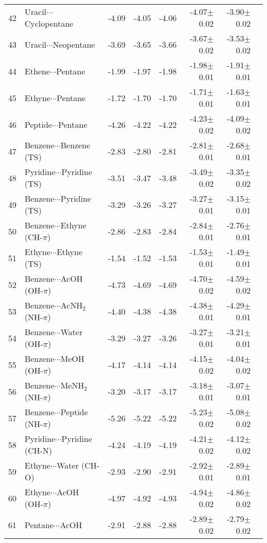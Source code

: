 \begin{longtable}{llrrrrrr}
42 & Uracil$\cdots$Cyclopentane & -4.09 & -4.05 & -4.06 & -4.07$\pm$0.02 & -3.90$\pm$0.02 \\
43 & Uracil$\cdots$Neopentane & -3.69 & -3.65 & -3.66 & -3.67$\pm$0.02 & -3.53$\pm$0.02 \\
44 & Ethene$\cdots$Pentane & -1.99 & -1.97 & -1.98 & -1.98$\pm$0.01 & -1.91$\pm$0.01 \\
45 & Ethyne$\cdots$Pentane & -1.72 & -1.70 & -1.70 & -1.71$\pm$0.01 & -1.63$\pm$0.01 \\
46 & Peptide$\cdots$Pentane & -4.26 & -4.22 & -4.22 & -4.23$\pm$0.02 & -4.09$\pm$0.02 \\
47 & Benzene$\cdots$Benzene (TS) & -2.83 & -2.80 & -2.81 & -2.81$\pm$0.01 & -2.68$\pm$0.01 \\
48 & Pyridine$\cdots$Pyridine (TS) & -3.51 & -3.47 & -3.48 & -3.49$\pm$0.02 & -3.35$\pm$0.02 \\
49 & Benzene$\cdots$Pyridine (TS) & -3.29 & -3.26 & -3.27 & -3.27$\pm$0.01 & -3.15$\pm$0.01 \\
50 & Benzene$\cdots$Ethyne (CH-$\pi$) & -2.86 & -2.83 & -2.84 & -2.84$\pm$0.01 & -2.76$\pm$0.01 \\
51 & Ethyne$\cdots$Ethyne (TS) & -1.54 & -1.52 & -1.53 & -1.53$\pm$0.01 & -1.49$\pm$0.01 \\
52 & Benzene$\cdots$AcOH (OH-$\pi$) & -4.73 & -4.69 & -4.69 & -4.70$\pm$0.02 & -4.59$\pm$0.02 \\
53 & Benzene$\cdots$AcNH$_2$ (NH-$\pi$) & -4.40 & -4.38 & -4.38 & -4.38$\pm$0.01 & -4.29$\pm$0.01 \\
54 & Benzene$\cdots$Water (OH-$\pi$) & -3.29 & -3.27 & -3.26 & -3.27$\pm$0.01 & -3.21$\pm$0.01 \\
55 & Benzene$\cdots$MeOH (OH-$\pi$) & -4.17 & -4.14 & -4.14 & -4.15$\pm$0.02 & -4.04$\pm$0.02 \\
56 & Benzene$\cdots$MeNH$_2$ (NH-$\pi$) & -3.20 & -3.17 & -3.17 & -3.18$\pm$0.01 & -3.07$\pm$0.01 \\
57 & Benzene$\cdots$Peptide (NH-$\pi$) & -5.26 & -5.22 & -5.22 & -5.23$\pm$0.02 & -5.08$\pm$0.02 \\
58 & Pyridine$\cdots$Pyridine (CH-N) & -4.24 & -4.19 & -4.19 & -4.21$\pm$0.02 & -4.12$\pm$0.02 \\
59 & Ethyne$\cdots$Water (CH-O) & -2.93 & -2.90 & -2.91 & -2.92$\pm$0.01 & -2.89$\pm$0.01 \\
60 & Ethyne$\cdots$AcOH (OH-$\pi$) & -4.97 & -4.92 & -4.93 & -4.94$\pm$0.02 & -4.86$\pm$0.02 \\
61 & Pentane$\cdots$AcOH & -2.91 & -2.88 & -2.88 & -2.89$\pm$0.02 & -2.79$\pm$0.02 \\

\end{longtable}
